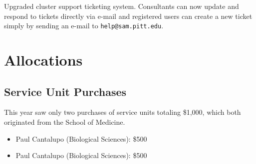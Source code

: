 Upgraded cluster support ticketing system.  Consultants can now update and
respond to tickets directly via e-mail and registered users can create a
new ticket simply by sending an e-mail to \texttt{help@sam.pitt.edu}.


\section{Allocations}
\subsection{Service Unit Purchases}
This year saw only two purchases of service units totaling \$1,000, which both originated from the School of Medicine.
\begin{itemize}
    \item Paul Cantalupo (Biological Sciences): \$500
    \item Paul Cantalupo (Biological Sciences): \$500
\end{itemize}

